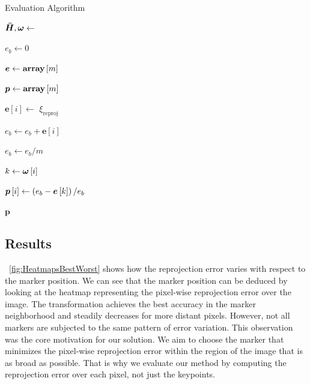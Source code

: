 \def\meanerrs{\boldsymbol{e}}
\def\errdiffs{\boldsymbol{p}}
\def\arracc{\left[ \right]}

\begin{algorithm}[t]
    \caption{Evaluation Algorithm}
    \label{alg:EvaluationAlgorithm}
    \begin{algorithmic}[1]
        \State $\boldsymbol{\bar{H}}, \boldsymbol{\omega} \gets $ 

        \State $e_b \gets 0$

        \State $\meanerrs \gets \arraydef \left[ m \right]$

        \State $\errdiffs \gets \arraydef \left[ m \right]$

        \State $\meanerrs \left[ i \right] \gets $ $\xi_{\text{reproj}}$

        \State $e_b \gets e_b + \meanerrs \left[ i \right]$
        \EndFor

        \State $e_b \gets e_b / m$

        \State $k \gets \boldsymbol{\omega} \left[ i \right]$

        \State $\errdiffs \left[ i \right] \gets \rbrackets{e_b - \meanerrs \left[ k \right]} / e_b$
        \EndFor

        \State \Return $\errdiffs$
    \end{algorithmic}
\end{algorithm}

\subsection{Results}
\label{ssec:EvaluationResults}

\figstr{}~\ref{fig:HeatmapsBestWorst} shows how the reprojection error varies with respect to the marker position. We can see that the marker position can be deduced by looking at the heatmap representing the pixel-wise reprojection error over the image. The transformation achieves the best accuracy in the marker neighborhood and steadily decreases for more distant pixels. However, not all markers are subjected to the same pattern of error variation. This observation was the core motivation for our solution. We aim to choose the marker that minimizes the pixel-wise reprojection error within the region of the image that is as broad as possible. That is why we evaluate our method by computing the reprojection error over each pixel, not just the keypoints.

